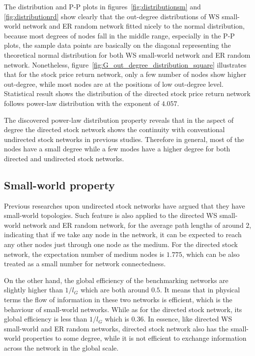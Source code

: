 The distribution and P-P plots in figures~\ref{fig:distributionsm} and \ref{fig:distributionrd} show clearly that the out-degree distributions of WS small-world network and ER random network fitted nicely to the normal distribution, because most degrees of nodes fall in the middle range, especially in the P-P plots, the sample data points are basically on the diagonal representing the theoretical normal distribution for both WS small-world network and ER random network. Nonetheless, figure~\ref{fig:G_out_degree_distribution_square} illustrates that for the stock price return network, only a few number of nodes show higher out-degree, while most nodes are at the positions of low out-degree level. Statistical result shows the distribution of the directed stock price return network follows power-law distribution with the exponent of $4.057$.

The discovered power-law distribution property reveals that in the aspect of degree the directed stock network shows the continuity with conventional undirected stock networks in previous studies. Therefore in general, most of the nodes have a small degree while a few modes have a higher degree for both directed and undirected stock networks.

\subsection{Small-world property}
Previous researches upon undirected stock networks have argued that they have small-world topologies. Such feature is also applied to the directed WS small-world network and ER random network, for the average path lengths of around $2$, indicating that if we take any node in the network, it can be expected to reach any other nodes just through one node as the medium. For the directed stock network, the expectation number of medium nodes is $1.775$, which can be also treated as a small number for network connectedness.

On the other hand, the global efficiency of the benchmarking networks are slightly higher than $1/l_G$ which are both around $0.5$. It means that in physical terms the flow of information in these two networks is efficient, which is the behaviour of small-world networks. While as for the directed stock network, its global efficiency is less than $1/l_G$ which is $0.36$. In essence, like directed WS small-world and ER random networks, directed stock network also has the small-world properties to some degree, while it is not efficient to exchange information across the network in the global scale.

